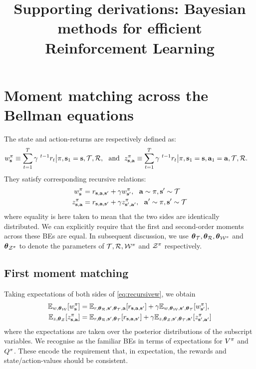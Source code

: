 \documentclass{article}
\title{Supporting derivations: Bayesian methods for efficient Reinforcement Learning}
\author{}
\begin{document}
\maketitle



\section*{Moment matching across the Bellman equations}

The state and action-returns are respectively defined as:
\begin{align*}
w^\pi_{\mathbf{s}} &\equiv \sum_{t = 1}^T \gamma^{~t - 1} r_t \big| \pi, \mathbf{s}_1 = \mathbf{s}, \mathcal{T}, \mathcal{R}, ~ \text{ and } ~ z^\pi_{\mathbf{s}, \mathbf{a}} \equiv \sum_{t = 1}^T \gamma^{~t - 1} r_t \big| \pi, \mathbf{s}_1 = \mathbf{s}, \mathbf{a}_1 = \mathbf{a}, \mathcal{T}, \mathcal{R}.
\end{align*}
They satisfy corresponding recursive relations:
\begin{align} \label{eq:recursivew}
w^\pi_{\mathbf{s}} &=  r_{\mathbf{s}, \mathbf{a}, \mathbf{s}'} + \gamma w^\pi_{\mathbf{s}'}, ~~ \mathbf{a} \sim \pi, \mathbf{s}' \sim \mathcal{T}\\
z^\pi_{\mathbf{s}, \mathbf{a}} &=  r_{\mathbf{s}, \mathbf{a}, \mathbf{s}'} + \gamma z^\pi_{\mathbf{s}', \mathbf{a}'}, ~~ \mathbf{a}' \sim \pi, \mathbf{s}' \sim \mathcal{T} \label{eq:recursivez}
\end{align}
where equality is here taken to mean that the two sides are identically distributed. We can explicitly require that the first and second-order moments across these BEs are equal. In subsequent discussion, we use $\boldsymbol{\theta}_{\mathcal{T}}, \boldsymbol{\theta}_{\mathcal{R}}, \boldsymbol{\theta}_{\mathcal{W}^\pi}$ and $\boldsymbol{\theta}_{\mathcal{Z}^\pi}$ to denote the parameters of $\mathcal{T}, \mathcal{R}, \mathcal{W}^\pi$ and $\mathcal{Z}^\pi$ respectively.

\subsection*{First moment matching}

Taking expectations of both sides of \cref{eq:recursivew}, we obtain
\begin{equation}\label{muconsist}
\begin{aligned} 
\mathbb{E}_{w, \boldsymbol{\theta}_{\mathcal{W}}}[w^\pi_{\mathbf{s}}] &=  \mathbb{E}_{r, \boldsymbol{\theta}_{\mathcal{R}}, \mathbf{s}', \boldsymbol{\theta}_{\mathcal{T}}, \mathbf{a}}[r_{\mathbf{s}, \mathbf{a}, \mathbf{s}'}] + \gamma  \mathbb{E}_{w, \boldsymbol{\theta}_{\mathcal{W}}, \mathbf{s}', \boldsymbol{\theta}_{\mathcal{T}}}[w^\pi_{\mathbf{s}'}], \\
\mathbb{E}_{z, \boldsymbol{\theta}_{\mathcal{Z}}}[z^\pi_{\mathbf{s}, \mathbf{a}}] &=  \mathbb{E}_{r, \boldsymbol{\theta}_{\mathcal{R}}, \mathbf{s}', \boldsymbol{\theta}_{\mathcal{T}}}[r_{\mathbf{s}, \mathbf{a}, \mathbf{s}'}] + \gamma \mathbb{E}_{z, \boldsymbol{\theta}_{\mathcal{Z}}, \mathbf{s}', \boldsymbol{\theta}_{\mathcal{T}}, \mathbf{a}'}[z^\pi_{\mathbf{s}', \mathbf{a}'}]
\end{aligned}
\end{equation}
where the expectations are taken over the posterior distributions of the subscript variables. We recognise as the familiar BEs in terms of expectations for $V^{\pi}$ and $Q^{\pi}$. These encode the requirement that, in expectation, the rewards and state/action-values should be consistent.
\end{document}
